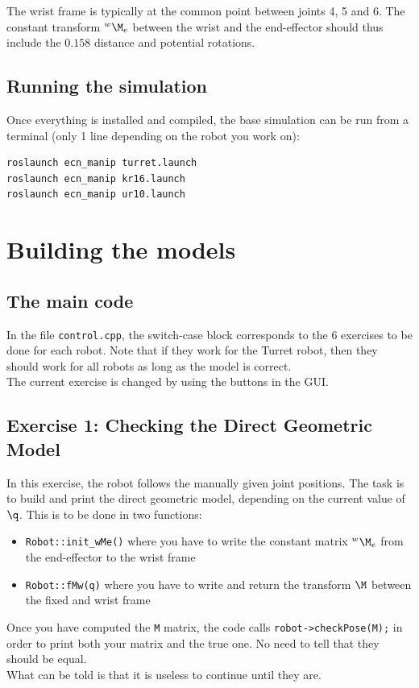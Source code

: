 \documentclass{ecnreport}
\begin{document}
The wrist frame is typically at the common point between joints 4, 5 and 6.
The constant transform $\wMe$ between the wrist and the end-effector should thus include the $0.158$ distance and potential rotations.

\subsection{Running the simulation}

Once everything is installed and compiled, the base simulation can be run from a terminal (only 1 line depending on the robot you work on):
\cppstyle
\begin{lstlisting}
roslaunch ecn_manip turret.launch
roslaunch ecn_manip kr16.launch
roslaunch ecn_manip ur10.launch
\end{lstlisting}


\section{Building the models}

\subsection*{The main code}

In the file \texttt{control.cpp}, the switch-case block corresponds to the 6 exercises to be done for each robot. Note that if they work for the Turret robot, then 
they should work for all robots as long as the model is correct. \\
The current exercise is changed by using the buttons in the GUI.

\subsection*{Exercise 1: Checking the Direct Geometric Model}

In this exercise, the robot follows the manually given joint positions. The task is to build and print the direct geometric model, depending on the current value of $\q$. This is to be done in two functions:
\begin{itemize}
	\item \texttt{Robot::init\_wMe()} where you have to write the constant matrix $\wMe$ from the end-effector to the wrist frame
	\item \texttt{Robot::fMw(q)}  where you have to write and return the transform $\M$ between the fixed and wrist frame
\end{itemize}
Once you have computed the \texttt{M} matrix, the code calls \texttt{robot->checkPose(M);} in order to print both your matrix and the true one. No need to tell that they should be equal.\\
What can be told is that it is useless to continue until they are.
\end{document}
